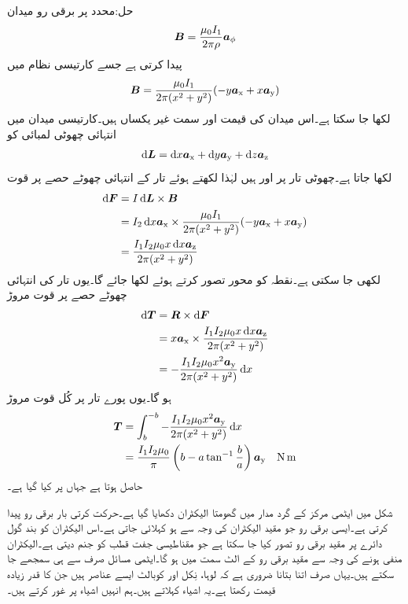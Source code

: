 حل:محدد  پر برقی رو میدان 
\begin{align*}
{\ensuremath{{\boldsymbol{B}}}}=\frac{\mu_0 I_1}{2\pi \rho}{\boldsymbol{a}}_{\phi}
\end{align*}
پیدا کرتی ہے جسے کارتیسی نظام میں
\begin{align*}
{\ensuremath{{\boldsymbol{B}}}}=\frac{\mu_0 I_1}{2\pi(x^2+y^2)} (-y{\boldsymbol{a}}_{\textup{x}}+x{\boldsymbol{a}}_{\textup{y}})
\end{align*}
لکھا جا سکتا ہے۔اس میدان کی قیمت اور سمت غیر یکساں ہیں۔کارتیسی میدان میں انتہائی چھوٹی لمبائی کو
\begin{align*}
\dif \kvec{L}=\dif x \ax+\dif y \ay +\dif z \az
\end{align*}
لکھا جاتا ہے۔چھوٹی تار پر  اور  ہیں لہٰذا  لکھتے ہوئے تار کے انتہائی چھوٹے حصے پر قوت
\begin{align*}
\dif \kvec{F}&=I \dif \kvec{L} \times \kvec{B}\\
&=I_2 \dif x \ax \times \frac{\mu_0 I_1}{2\pi(x^2+y^2)} (-y\ax+x\ay)\\
&=\frac{I_1 I_2 \mu_0 x \dif x \az}{2\pi (x^2+y^2)}
\end{align*}
لکھی جا سکتی ہے۔نقطہ  کو محور تصور کرتے ہوئے  لکھا جائے گا۔یوں تار کی انتہائی چھوٹے حصے پر قوت مروڑ
\begin{align*}
\dif \kvec{T}&=\kvec{R} \times \dif \kvec{F}\\
&=x\ax \times \frac{I_1 I_2 \mu_0 x \dif x \az}{2\pi (x^2+y^2)}\\
&=-\frac{I_1 I_2 \mu_0 x^2 \ay}{2\pi (x^2+y^2)} \dif x
\end{align*}
ہو گا۔یوں پورے تار پر کُل قوت مروڑ
\begin{align*}
\kvec{T}&=\int_{b}^{-b}-\frac{I_1 I_2 \mu_0 x^2 \ay}{2\pi (x^2+y^2)} \dif x\\
&=\frac{I_1 I_2 \mu_0}{\pi} \left(b-a \tan^{-1} \frac{b}{a}\right)\ay \quad \si{\newton \meter}
\end{align*}
حاصل ہوتا ہے جہاں  پر کیا گیا ہے۔

شکل  میں ایٹمی مرکز کے گرد مدار میں گھومتا الیکٹران دکھایا گیا ہے۔حرکت کرتی بار برقی رو پیدا کرتی ہے۔ایسی برقی رو جو مقید الیکٹران کی وجہ سے ہو    کہلائی جاتی  ہے۔اس الیکٹران کو بند گول دائرے پر مقید برقی رو تصور کیا جا سکتا ہے جو مقناطیسی جفت قطب  کو جنم دیتی ہے۔الیکٹران منفی ہونے کی وجہ سے   مقید برقی  رو   کے الٹ سمت میں ہو گا۔ایٹمی مسائل صرف  سے ہی سمجھے جا سکتے ہیں۔یہاں صرف اتنا بتانا ضروری ہے کہ لوہا، نِکل اور کوبالٹ  ایسے  عناصر ہیں جن کا   قدر زیادہ قیمت رکھتا ہے۔یہ اشیاء  کہلاتے ہیں۔ہم انہیں اشیاء پر غور کرتے ہیں۔

